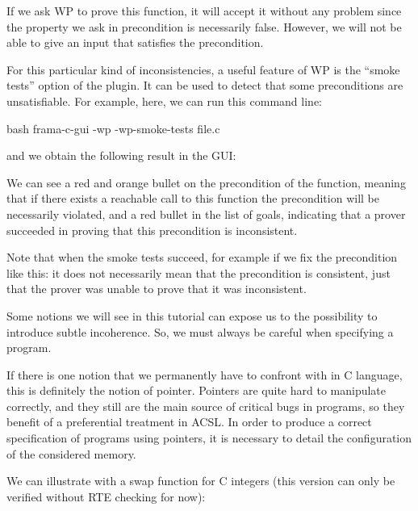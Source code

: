 

If we ask WP to prove this function, it will accept it without any problem
since the property we ask in precondition is necessarily false.
However, we will not be able to give an input that satisfies the
precondition.


For this particular kind of inconsistencies, a useful feature of WP is
the ``smoke tests'' option of the plugin. It can be used to detect that
some preconditions are unsatisfiable. For example, here, we can run this
command line:


\begin{CodeBlock}{bash}
  frama-c-gui -wp -wp-smoke-tests file.c
\end{CodeBlock}


and we obtain the following result in the GUI:




We can see a red and orange bullet on the precondition of the function,
meaning that if there exists a reachable call to this function the
precondition will be necessarily violated, and a red bullet in the
list of goals, indicating that a prover succeeded in proving that this
precondition is inconsistent.


Note that when the smoke tests succeed, for example if we fix the
precondition like this:
it does not necessarily mean that the precondition is consistent, just
that the prover was unable to prove that it was inconsistent.


Some notions we will see in this tutorial can expose us to the
possibility to introduce subtle incoherence. So, we must always be
careful when specifying a program.




If there is one notion that we permanently have to confront with in C
language, this is definitely the notion of pointer. Pointers are quite
hard to manipulate correctly, and they still are the main source of
critical bugs in programs, so they benefit of a preferential treatment
in ACSL. In order to produce a correct specification of programs using
pointers, it is necessary to detail the configuration of the considered
memory.

We can illustrate with a swap function for C integers (this version can
only be verified without RTE checking for now):






